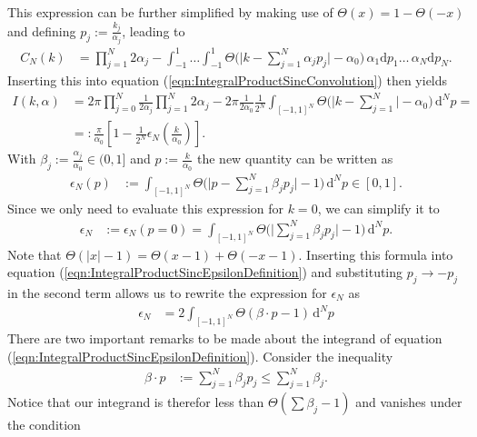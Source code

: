 \documentclass[german, parskip=full]{scrartcl}
\newcommand{\intx}{}
\newcommand{\kla}{}
\newcommand{\klam}{}
\begin{document}
This expression can be further simplified by making use of $\Theta(x)=1-\Theta(-x)$ and defining $p_j:=\frac{k_j}{\alpha_j}$, leading to
\begin{align*}
C_N(k)&=\prod_{j=1}^N 2\alpha_j-\intx\int_{-1}^{1}\dots\intx\int_{-1}^{1}\Theta\bigg(\Big\vert k-\sum_{j=1}^N\alpha_jp_j\Big\vert - \alpha_0\bigg)\,\alpha_1\mathrm{d}p_1\dots\,\alpha_N\mathrm{d}p_N.
\end{align*}
Inserting this into equation (\ref{eqn:IntegralProductSincConvolution}) then yields
\begin{align*}
I(k,\alpha)&=2\pi\prod_{j=0}^N\frac{1}{2\alpha_j}\prod_{j=1}^N2\alpha_j-2\pi\frac{1}{2\alpha_0}\frac{1}{2^N}\intx\int_{[-1,1]^N}\Theta\bigg(\Big\vert k-\sum_{j=1}^N\Big\vert-\alpha_0\bigg)\,\mathrm{d}^Np=\\
&=:\frac{\pi}{\alpha_0}\klam\left[ {1-\frac{1}{2^N}\epsilon_N\kla\left( {\frac{k}{\alpha_0}} \right)} \right].
\end{align*}
With $\beta_j:=\frac{\alpha_j}{\alpha_0}\in (0,1]$ and $p:=\frac{k}{\alpha_0}$ the new quantity can be written as
\begin{align}
\epsilon_N(p)&:=\intx\int_{[-1,1]^N}^{ }\Theta\bigg(\Big\vert p-\sum_{j=1}^N\beta_jp_j\Big\vert - 1\bigg)\,\mathrm{d}^Np\in [0,1]. \label{eqn:IntegralProductSincFTEpsilonDefinition}
\end{align}
Since we only need to evaluate this expression for $k=0$, we can simplify it to
\begin{align}
\epsilon_N&:=\epsilon_N(p=0)=\intx\int_{[-1,1]^N}^{ }\Theta\bigg(\Big\vert \sum_{j=1}^N\beta_jp_j\Big\vert - 1\bigg)\,\mathrm{d}^Np. \label{eqn:IntegralProductSincEpsilonDefinition}
\end{align}
Note that $\Theta(|x|-1)=\Theta(x-1)+\Theta(-x-1)$.
Inserting this formula into equation (\ref{eqn:IntegralProductSincEpsilonDefinition}) and  substituting $p_j\rightarrow -p_j$ in the second term allows us to rewrite the expression for $\epsilon_N$ as
\begin{align}
\epsilon_N&=2\intx\int_{[-1,1]^N}^{ }\Theta (\beta\cdot p-1)\,\mathrm{d}^Np
\end{align}
There are two important remarks to be made about the integrand of equation (\ref{eqn:IntegralProductSincEpsilonDefinition}).
Consider the inequality
\begin{align*}
\beta\cdot p&:=\sum_{j=1}^N\beta_jp_j\le\sum_{j=1}^N\beta_j. 
\end{align*}
Notice that our integrand is therefor less than $\Theta(\sum\beta_j-1)$ and vanishes under the condition 
\end{document}
